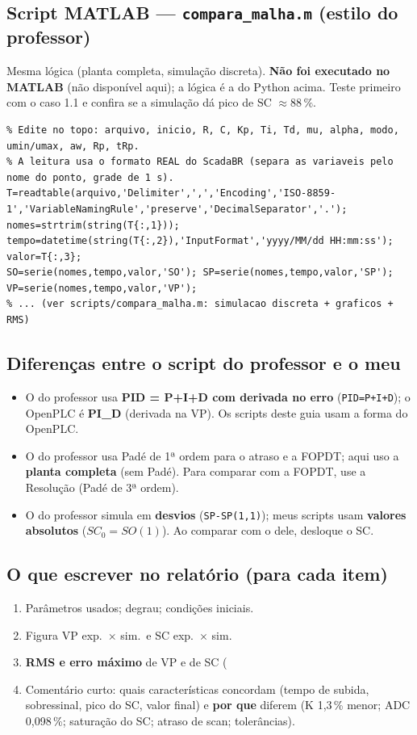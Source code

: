 \documentclass[11pt,a4paper]{article}
\begin{document}
\subsection{Script MATLAB --- \texttt{compara\_malha.m} (estilo do professor)}
Mesma lógica (planta completa, simulação discreta). \textbf{Não foi executado no MATLAB} (não disponível aqui); a lógica é a do Python acima. Teste primeiro com o caso 1.1 e confira se a simulação dá pico de SC $\approx88\,\%$.
\begin{lstlisting}
% Edite no topo: arquivo, inicio, R, C, Kp, Ti, Td, mu, alpha, modo, umin/umax, aw, Rp, tRp.
% A leitura usa o formato REAL do ScadaBR (separa as variaveis pelo nome do ponto, grade de 1 s).
T=readtable(arquivo,'Delimiter',',','Encoding','ISO-8859-1','VariableNamingRule','preserve','DecimalSeparator','.');
nomes=strtrim(string(T{:,1})); tempo=datetime(string(T{:,2}),'InputFormat','yyyy/MM/dd HH:mm:ss'); valor=T{:,3};
SO=serie(nomes,tempo,valor,'SO'); SP=serie(nomes,tempo,valor,'SP'); VP=serie(nomes,tempo,valor,'VP');
% ... (ver scripts/compara_malha.m: simulacao discreta + graficos + RMS)
\end{lstlisting}
\subsection{Diferenças entre o script do professor e o meu}
\begin{itemize}
\item O do professor usa \textbf{PID = P+I+D com derivada no erro} (\texttt{PID=P+I+D}); o OpenPLC é \textbf{PI\_D} (derivada na VP). Os scripts deste guia usam a forma do OpenPLC.
\item O do professor usa Padé de 1ª ordem para o atraso e a FOPDT; aqui uso a \textbf{planta completa} (sem Padé). Para comparar com a FOPDT, use a Resolução (Padé de 3ª ordem).
\item O do professor simula em \textbf{desvios} (\texttt{SP-SP(1,1)}); meus scripts usam \textbf{valores absolutos} ($SC_0=SO(1)$). Ao comparar com o dele, desloque o SC.
\end{itemize}
\subsection{O que escrever no relatório (para cada item)}
\begin{enumerate}
\item Parâmetros usados; degrau; condições iniciais.
\item Figura VP exp.\ $\times$ sim.\ e SC exp.\ $\times$ sim.
\item \textbf{RMS e erro máximo} de VP e de SC (%
\item Comentário curto: quais características concordam (tempo de subida, sobressinal, pico do SC, valor final) e \textbf{por que} diferem (K 1,3\,\% menor; ADC 0,098\,\%; saturação do SC; atraso de scan; tolerâncias).
\end{enumerate}
\end{document}
